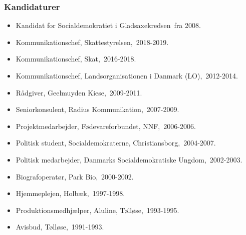 \documentclass[11pt, a4paper]{awesome-cv}
\begin{document}
\begin{cvletter}
\subsubsection*{Kandidaturer}
\begin{itemize}
\item Kandidat for Socialdemokratiet i Gladsaxekredsen fra 2008.
\end{itemize}
\begin{itemize}
\item Kommunikationschef, Skattestyrelsen, 2018-2019.
\item Kommunikationschef, Skat, 2016-2018.
\item Kommunikationschef, Landsorganisationen i Danmark (LO), 2012-2014.
\item Rådgiver, Geelmuyden Kiese, 2009-2011.
\item Seniorkonsulent, Radius Kommunikation, 2007-2009.
\item Projektmedarbejder, Fødevareforbundet, NNF, 2006-2006.
\item Politisk student, Socialdemokraterne, Christiansborg, 2004-2007.
\item Politisk medarbejder, Danmarks Socialdemokratiske Ungdom, 2002-2003.
\item Biografoperatør, Park Bio, 2000-2002.
\item Hjemmeplejen, Holbæk, 1997-1998.
\item Produktionsmedhjælper, Aluline, Tølløse, 1993-1995.
\item Avisbud, Tølløse, 1991-1993.
\end{itemize}
\end{cvletter}
\end{document}
